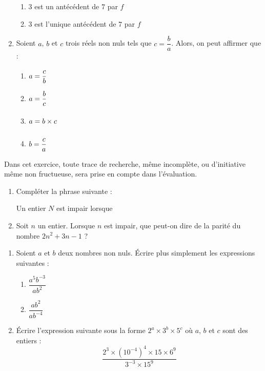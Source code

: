 \documentclass[a4paper,dvipsnames]{article}
\begin{document}
\begin{enumerate}
\begin{multicols}{4}
\begin{enumerate}
	\item $3$ est un antécédent de $7$ par $f$
	\item $3$ est l'unique antécédent de $7$ par $f$
      \end{enumerate}
    \end{multicols}
  \item Soient $a$, $b$ et $c$ trois réels non nuls tels que $c = \dfrac{b}{a}$. Alors, on peut affirmer que :
    \begin{multicols}{4}
      \begin{enumerate}
	\item $a=\dfrac{c}{b}\vphantom{\dfrac{b}{b}}$
	\item $a=\dfrac{b}{c}\vphantom{\dfrac{b}{b}}$
	\item $a=b\times c\vphantom{\dfrac{b}{b}}$
	\item $b=\dfrac{c}{a}\vphantom{\dfrac{b}{b}}$
      \end{enumerate}
    \end{multicols}
\end{enumerate}

\bigskip

\exo[4 points] \vspace{-2mm} Dans cet exercice, toute trace de recherche, même incomplète, ou d'initiative même non fructueuse, sera prise en compte dans l'évaluation.

\smallskip

\begin{enumerate}
  \item Compléter la phrase suivante :
    \begin{center}
      \og{}Un entier $N$ est impair lorsque \dotfill\fg{}
    \end{center}
  \item Soit $n$ un entier. Lorsque $n$ est impair, que peut-on dire de la parité du nombre $2n^2+3n-1$ ?
\end{enumerate}

\bigskip

\exo[4 points] \vspace{-2mm}
\begin{enumerate}
  \item Soient $a$ et $b$ deux nombres non nuls. Écrire plus simplement les expressions suivantes :
    \begin{multicols}{2}
      \begin{enumerate}
	\item $\dfrac{a^5b^{-3}}{ab^2}$
	\item $\dfrac{ab^2}{ab^{-4}}$
      \end{enumerate}\columnbreak 
    \end{multicols}
    \dotfill{}
  \item Écrire l'expression suivante sous la forme $2^a\times3^b\times5^c$ où $a$, $b$ et $c$ sont des entiers :
    \[\dfrac{2^3\times\left(10^{-4}\right)^4\times15\times6^9}{3^{-3}\times15^9}\]
    \dotfill{}
\end{enumerate}
\end{document}
